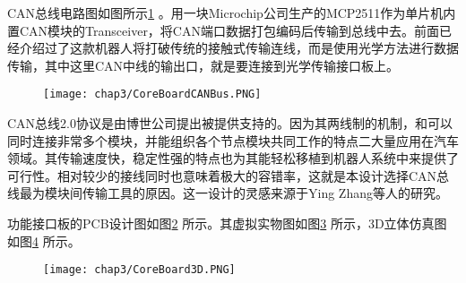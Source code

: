 CAN总线电路图如图所示\ref{fig.BaseCAN} 。用一块Microchip公司生产的MCP2511作为单片机内置CAN模块的Transceiver，将CAN端口数据打包编码后传输到总线中去。前面已经介绍过了这款机器人将打破传统的接触式传输连线，而是使用光学方法进行数据传输，其中这里CAN中线的输出口，就是要连接到光学传输接口板上。
\begin{figure}[!htp]\label{fig.BaseCAN}
  \centering
  \texttt{[image: chap3/CoreBoardCANBus.PNG]}
\end{figure}


CAN总线2.0协议是由博世公司提出被提供支持的。因为其两线制的机制，和可以同时连接非常多个模块，并能组织各个节点模块共同工作的特点二大量应用在汽车领域。其传输速度快，稳定性强的特点也为其能轻松移植到机器人系统中来提供了可行性。相对较少的接线同时也意味着极大的容错率，这就是本设计选择CAN总线最为模块间传输工具的原因。这一设计的灵感来源于Ying Zhang等人的研究。

功能接口板的PCB设计图如图\ref{fig.CorePCB} 所示。其虚拟实物图如图\ref{fig.CoreReal} 所示，3D立体仿真图如图\ref{fig.Core3D} 所示。 
\begin{figure}\label{fig.CorePCB}
  \centering
  \hspace{1in}
\end{figure}
\begin{figure}\label{fig.CoreReal}
  \centering
  \hspace{1in}
\end{figure}
\begin{figure}[!htp]\label{fig.Core3D}
  \centering
  \texttt{[image: chap3/CoreBoard3D.PNG]}
\end{figure}
